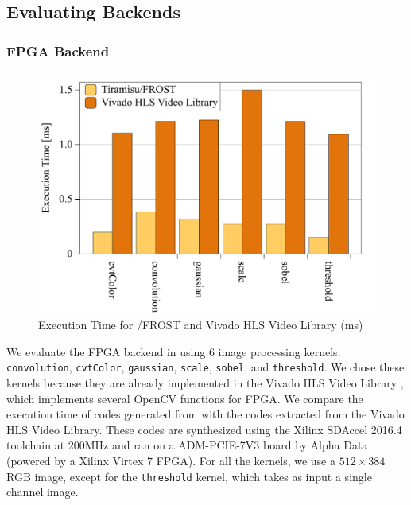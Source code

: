 \subsection{Evaluating Backends}

\subsubsection{FPGA Backend}

\begin{figure}
\centering
 \includegraphics[width=0.75\columnwidth]{./figures/tiramisu_vs_vivado}
 \caption{Execution Time for \framework/FROST and Vivado HLS Video Library (ms)}
 \label{fig:speedupHLS}
 \vspace{-0.5cm}
\end{figure}

We evaluate the FPGA backend in \framework{} using 6 image processing kernels: \texttt{convolution}, \texttt{cvtColor}, \texttt{gaussian}, \texttt{scale}, \texttt{sobel}, and \texttt{threshold}.
We chose these kernels because they are already implemented in the Vivado HLS Video Library \cite{opencvHLS}, which implements several OpenCV functions for FPGA.
We compare the execution time of codes generated from \framework{} with the codes extracted from the Vivado HLS Video Library.  These codes are synthesized using the Xilinx SDAccel 2016.4 toolchain at 200MHz and ran on a ADM-PCIE-7V3 board by Alpha Data (powered by a Xilinx Virtex 7 FPGA). 
For all the kernels, we use a $512\times384$ RGB image, except for the \texttt{threshold} kernel, which takes as input a single channel image. 

